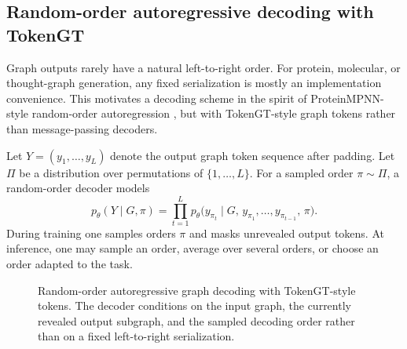 \documentclass[11pt]{article}
\theoremstyle{definition}
\theoremstyle{plain}
\theoremstyle{remark}
\begin{document}
\subsection{Random-order autoregressive decoding with TokenGT}
\label{sec:random-order-decoding}

Graph outputs rarely have a natural left-to-right order.
For protein, molecular, or thought-graph generation, any fixed serialization is mostly an implementation convenience.
This motivates a decoding scheme in the spirit of ProteinMPNN-style random-order autoregression \cite{DauparasProteinMPNN2022}, but with TokenGT-style graph tokens rather than message-passing decoders.

Let $Y=(y_1,\dots,y_L)$ denote the output graph token sequence after padding.
Let $\Pi$ be a distribution over permutations of $\{1,\dots,L\}$.
For a sampled order $\pi\sim\Pi$, a random-order decoder models
\[
p_\theta(Y\mid G,\pi)
=
\prod_{t=1}^{L}
p_\theta\!\bigl(
y_{\pi_t}\mid
G,\,
y_{\pi_1},\dots,y_{\pi_{t-1}},\,
\pi
\bigr).
\]
During training one samples orders $\pi$ and masks unrevealed output tokens.
At inference, one may sample an order, average over several orders, or choose an order adapted to the task.

\begin{figure}[t]
\centering
{}
\caption{Random-order autoregressive graph decoding with TokenGT-style tokens.
The decoder conditions on the input graph, the currently revealed output subgraph, and the sampled decoding order rather than on a fixed left-to-right serialization.}
\label{fig:tokengt-random-order}
\end{figure}
\end{document}
